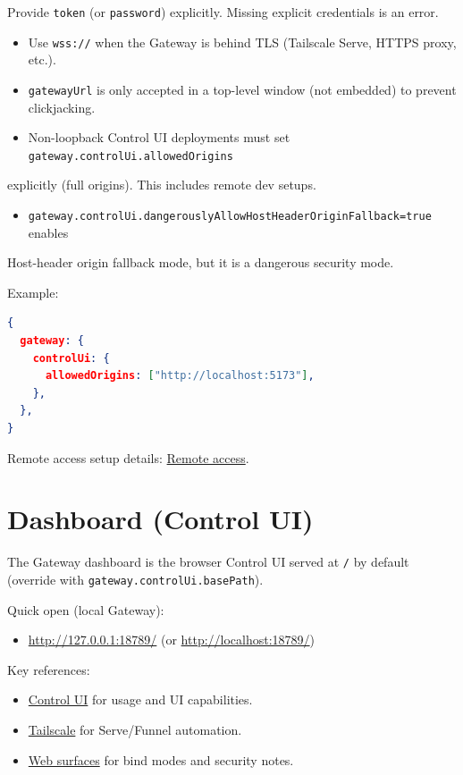Provide \texttt{token} (or \texttt{password}) explicitly. Missing explicit credentials is an error.
\begin{itemize}
  \item Use \texttt{wss://} when the Gateway is behind TLS (Tailscale Serve, HTTPS proxy, etc.).
  \item \texttt{gatewayUrl} is only accepted in a top-level window (not embedded) to prevent clickjacking.
  \item Non-loopback Control UI deployments must set \texttt{gateway.controlUi.allowedOrigins}
\end{itemize}

explicitly (full origins). This includes remote dev setups.
\begin{itemize}
  \item \texttt{gateway.controlUi.dangerouslyAllowHostHeaderOriginFallback=true} enables
\end{itemize}

Host-header origin fallback mode, but it is a dangerous security mode.

Example:

\begin{lstlisting}[language=json]
{
  gateway: {
    controlUi: {
      allowedOrigins: ["http://localhost:5173"],
    },
  },
}
\end{lstlisting}


Remote access setup details: \href{/gateway/remote}{Remote access}.


\clearpage

\section{Dashboard (Control UI)}


The Gateway dashboard is the browser Control UI served at \texttt{/} by default
(override with \texttt{gateway.controlUi.basePath}).

Quick open (local Gateway):

\begin{itemize}
  \item \href{http://127.0.0.1:18789/}{http://127.0.0.1:18789/} (or \href{http://localhost:18789/}{http://localhost:18789/})
\end{itemize}


Key references:

\begin{itemize}
  \item \href{/web/control-ui}{Control UI} for usage and UI capabilities.
  \item \href{/gateway/tailscale}{Tailscale} for Serve/Funnel automation.
  \item \href{/web}{Web surfaces} for bind modes and security notes.
\end{itemize}


